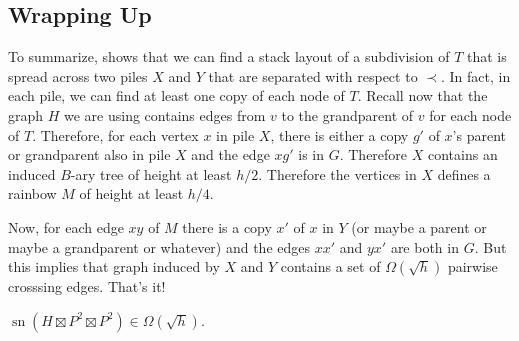 \documentclass[kpfonts]{patmorin}
\DeclareMathOperator{\sn}{sn}
\begin{document}
\subsection*{Wrapping Up}

To summarize,  shows that we can find a stack layout of a subdivision of $T$ that is spread across two piles $X$ and $Y$ that are separated with respect to $\prec$.  In fact, in each pile, we can find at least one copy of each node of $T$.  Recall now that the graph $H$ we are using contains edges from $v$ to the grandparent of $v$ for each node of $T$.  Therefore, for each vertex $x$ in pile $X$, there is either a copy $g'$ of $x$'s parent or grandparent also in pile $X$ and the edge $xg'$ is in $G$.  Therefore $X$ contains an induced $B$-ary tree of height at least $h/2$.  Therefore the vertices in $X$ defines a rainbow $M$ of height at least $h/4$.

Now, for each edge $xy$ of $M$ there is a copy $x'$ of $x$ in $Y$ (or maybe a parent or maybe a grandparent or whatever) and the edges $xx'$ and $yx'$ are both in $G$.  But this implies that graph induced by $X$ and $Y$ contains a set of $\Omega(\sqrt{h})$ pairwise crosssing edges.  That's it!

\begin{lem}
    $\sn(H\boxtimes P^2\boxtimes P^2) \in \Omega(\sqrt{h})$.
\end{lem}
\end{document}
